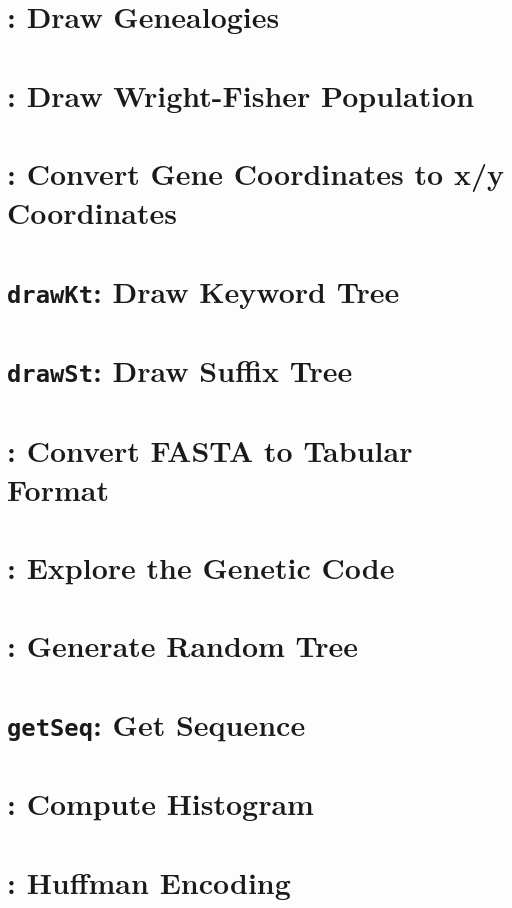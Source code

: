 \documentclass[a4paper]{book}
\begin{document}
\chapter{: Draw Genealogies}\label{ch:dgn}

\chapter{: Draw Wright-Fisher
  Population}\label{ch:dw}

\chapter{: Convert Gene Coordinates to x/y
  Coordinates}\label{ch:dg}

\chapter{\texttt{drawKt}: Draw Keyword Tree}\label{ch:dkt}

\chapter{\texttt{drawSt}: Draw Suffix Tree}\label{ch:dst}

\chapter{: Convert FASTA to Tabular
  Format}\label{ch:f2t}

\chapter{: Explore the Genetic Code}\label{ch:gc}

\chapter{: Generate Random Tree}\label{ch:gt}

\chapter{\texttt{getSeq}: Get Sequence}\label{ch:get}

\chapter{: Compute Histogram}\label{ch:his}

\chapter{: Huffman Encoding}\label{ch:huf}

\end{document}
